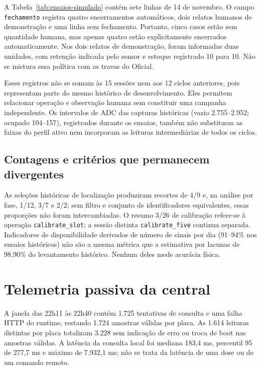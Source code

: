 A Tabela~\ref{tab:ensaios-simulado} contém sete linhas de 14 de novembro. O campo \texttt{fechamento} registra quatro encerramentos automáticos, dois relatos humanos de demonstração e uma linha sem fechamento. Portanto, cinco casos estão sem quantidade humana, mas apenas quatro estão explicitamente encerrados automaticamente. Nos dois relatos de demonstração, foram informadas duas unidades, com retenção indicada pelo sensor e estoque registrado 10 para 10. Não se mistura essa política com as travas do Oficial. 



Esses registros não se somam às 15 sessões nem aos 12 ciclos anteriores, pois representam parte do mesmo histórico de desenvolvimento. Eles permitem relacionar operação e observação humana sem constituir uma campanha independente. Os intervalos de ADC das capturas históricas (vazio 2.755--2.952; ocupado 104--157), registrados durante os ensaios, também não substituem as faixas do perfil ativo nem incorporam as leituras intermediárias de todos os ciclos. 

\subsection{Contagens e critérios que permanecem divergentes}
As seleções históricas de localização produziram recortes de 4/9 e, na análise por fase, 1/12, 3/7 e 2/2; sem filtro e conjunto de identificadores equivalentes, essas proporções não foram intercambiadas. O resumo 3/26 de calibração refere-se à operação \texttt{calibrate\_slot}; a sessão distinta \texttt{calibrate\_five} continua separada. Indicadores de disponibilidade derivados de número de sinais por dia (91--94\% nos ensaios históricos) não são a mesma métrica que a estimativa por lacunas de 98,90\% do levantamento histórico. Nenhum deles mede acurácia física. 

\section{Telemetria passiva da central}
A janela das 22h11 às 22h40 contém 1.725 tentativas de consulta e uma falha HTTP do runtime, restando 1.724 amostras válidas por placa. As 1.614 leituras distintas por placa totalizam 3.228 sem indicação de erro ou troca de boot nas amostras válidas. A latência da consulta local foi mediana 183,4 ms, percentil 95 de 277,7 ms e máximo de 7.932,1 ms; não se trata da latência de uma dose ou de um comando remoto. 

